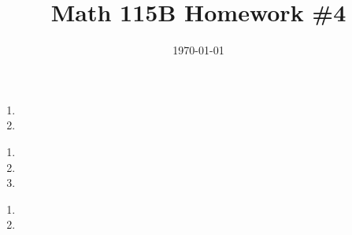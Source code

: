 \documentclass{article}
\date{\today}
\title{Math 115B Homework \#4}
\begin{document}
\maketitle

\begin{prob}
\end{prob}

\bigskip
\par
\begin{prob}
\end{prob}


\bigskip
\par
\begin{prob}
\end{prob}

\bigskip
\par
\begin{prob}
\end{prob}
\begin{enumerate}[label=(\alph*)]
    \item
    \item
\end{enumerate}


\bigskip
\par
\begin{prob}
\end{prob}

\bigskip
\par
\begin{prob}
\end{prob}

\bigskip
\par
\begin{prob}
\end{prob}
\begin{enumerate}[label=(\alph*)]
    \item
    \item
    \item
\end{enumerate}

\bigskip
\par
\begin{prob}
\end{prob}
\begin{enumerate}[label=(\alph*)]
    \item
    \item
\end{enumerate}




\end{document}
